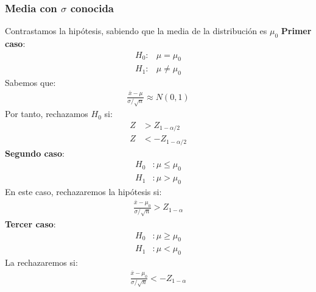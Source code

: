 \documentclass{article}
\begin{document}
\subsubsection{Media con $\sigma $ conocida}
Contrastamos la hipótesis, sabiendo que la media de la distribución es $\mu_{0}$
\textbf{Primer caso}:
\begin{equation}
    \begin{split}
        H_{0}:& \mu = \mu_{0}\\ H_{1}:& \mu \neq \mu_{0}
    \end{split}
\end{equation}
Sabemos que:
\begin{equation}
    \begin{split}
        \frac{\bar{x}-\mu }{\sigma / \sqrt{n}} \approx N(0,1)
    \end{split}
\end{equation}
Por tanto, rechazamos $H_{0}$ si:
\begin{equation}
    \begin{split}
        Z &> Z_{1-\alpha / 2}\\ Z &< -Z_{1- \alpha /2}
    \end{split}
\end{equation}
\textbf{Segundo caso}:
\begin{equation}
    \begin{split}
        H_{0}&: \mu \leq \mu_{0}\\ H_{1}&: \mu > \mu_{0}
    \end{split}
\end{equation}
En este caso, rechazaremos la hipótesis si:
\begin{equation}
    \begin{split}
        \frac{\bar{x}-\mu_{0}}{\sigma / \sqrt{n}}> Z_{1-\alpha }
    \end{split}
\end{equation}
\textbf{Tercer caso}:
\begin{equation}
    \begin{split}
        H_{0}&: \mu \geq \mu_{0}\\ H_{1}&: \mu < \mu_{0}
    \end{split}
\end{equation}
La rechazaremos si:
\begin{equation}
    \begin{split}
        \frac{\bar{x}-\mu_{0}}{\sigma / \sqrt{n}}< -Z_{1-\alpha }
    \end{split}
\end{equation}
\end{document}
